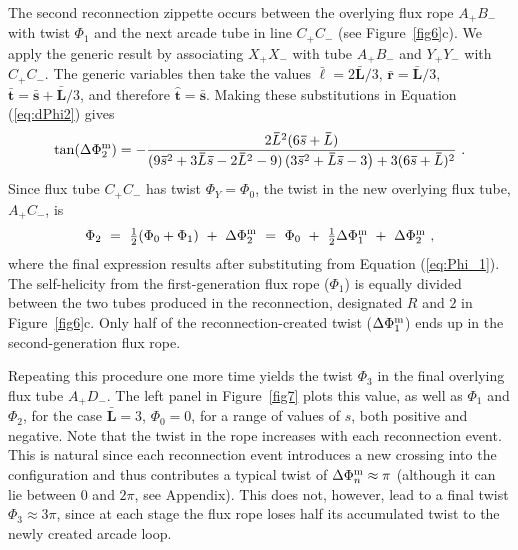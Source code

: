 \documentclass[10pt,namedreferneces]{SolarPhysics}
\def \half {\textstyle{\frac{1}{2}}}
\begin{document}
\begin{article}
The second reconnection zippette occurs between the overlying flux rope $A_+B_-$ with twist $\Phi_1$ and the next arcade tube in line $C_+C_-$ (see Figure\ \ref{fig6}c).  We apply the generic result by associating $X_+X_-$ with tube $A_+B_-$ and $Y_+Y_-$ with $C_+C_-$.  The generic variables then take the values $\bm\bar{\ell}=2\bm\bar{L}/3$, $\bm\bar{r}=\bm\bar{L}/3$, 
$\bm\bar{t}=\bm\bar{s}+\bm\bar{L}/3$, and therefore $\bm\hat{t}=\bm\bar{s}$.  Making these substitutions in Equation (\ref{eq:dPhi2}) gives
\begin{equation}
  \tan(\Delta\Phi_2^{\rm m}) = -{2\bm\bar{L}^2(6\bm\bar{s}+\bm\bar{L})\over (9\bm\bar{s}^2 + 3\bm\bar{L}\bm\bar{s} - 2\bm\bar{L}^2 - 9)\, ( 3\bm\bar{s}^2 + \bm\bar{L}\bm\bar{s} - 3\bigr) 
  +3(6\bm\bar{s}+\bm\bar{L})^2 } ~.
  	\label{eq:dPhi_g2}
\end{equation}
Since flux tube $C_+C_-$ has twist $\Phi_Y=\Phi_0$, the twist in the new overlying flux tube, $A_+C_-$, is
\begin{equation}
  \Phi_2 ~=~ \hbox{${1\over2}$}(\Phi_0+\Phi_1) ~+~ \Delta\Phi_2^{\rm m} ~=~ \Phi_0 ~+~ \half\Delta\Phi_1^{\rm m} ~+~ \Delta\Phi_2^{\rm m} ~,
  	\label{eq:Phi_2}
\end{equation}
where the final expression results after substituting from Equation  (\ref{eq:Phi_1}).  The self-helicity from the first-generation flux rope ($\Phi_1$) is equally divided between the two tubes produced in the reconnection, designated $R$ and $2$ in Figure\ \ref{fig6}c.  Only half of the reconnection-created twist ($\Delta\Phi^{\rm m}_1$) ends up in the second-generation flux rope.

Repeating this procedure one more time yields the twist $\Phi_3$ in the final overlying flux tube $A_+D_-$.  The left panel in Figure\ \ref{fig7} plots this value, as well as $\Phi_1$ and $\Phi_2$, for the case $\bm\bar{L}=3$, $\Phi_0=0$, for a range of values of $s$, both positive and negative.  Note that the twist in the rope increases with each reconnection event.  This is natural since each reconnection event introduces a new crossing into the configuration and thus contributes a typical twist of
 $\Delta\Phi^{\rm m}_n\approx\pi$
(although it can lie between 0 and $2\pi$, see Appendix).
 This does not, however, lead to a final twist $\Phi_3\approx 3\pi$, since at each stage the flux rope loses half its accumulated twist to the newly created arcade loop.


\end{article}
\end{document}
